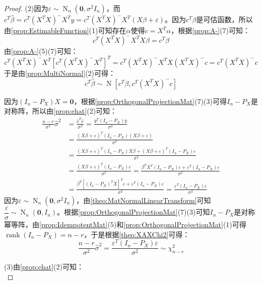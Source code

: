 \begin{proof}
	(2)因为$\varepsilon\sim\operatorname{N}_n(\mathbf{0},\sigma^2I_n)$，而$c^T\hat{\beta}=c^T(X^TX)^-X^Ty=c^T(X^TX)^-X^T(X\beta+\varepsilon)$。因为$c^T\beta$是可估函数，所以由\cref{prop:EstimableFunction}(1)可知存在$\alpha$使得$c=X^T\alpha$，根据\cref{prop:A-}(7)可知：
	\begin{equation*}
		c^T(X^TX)^-X^TX\beta=c^T\beta
	\end{equation*}
	由\cref{prop:A-}(5)(7)可知：
	\begin{equation*}
		c^T(X^TX)^-X^T[c^T(X^TX)^-X^T]^T=c^T(X^TX)^-X^TX(X^TX)^-c=c^T(X^TX)^-c
	\end{equation*}
	于是由\cref{prop:MultiNormal}(2)可得：
	\begin{equation*}
		c^T\hat{\beta}\sim\operatorname{N}[c^T\beta,c^T(X^TX)^-c]
	\end{equation*}\par
	因为$(I_n-P_X)X=\mathbf{0}$，根据\cref{prop:OrthogonalProjectionMat}(7)(3)可得$I_n-P_X$是对称阵，所以由\cref{prop:ehat}(2)可知：
	\begin{align*}
		\frac{n-r}{\sigma^2}\hat{\sigma}^2&=\frac{\hat{e}^T\hat{e}}{\sigma^2}=\frac{y^T(I_n-P_X)y}{\sigma^2} \\
		&=\frac{(X\beta+\varepsilon)^T(I_n-P_X)(X\beta+\varepsilon)}{\sigma^2} \\
		&=\frac{(X\beta+\varepsilon)^T(I_n-P_X)X\beta+(X\beta+\varepsilon)^T(I_n-P_X)\varepsilon}{\sigma^2} \\
		&=\frac{(X\beta+\varepsilon)^T(I_n-P_X)\varepsilon}{\sigma^2}=\frac{\beta^TX^T(I_n-P_X)\varepsilon+\varepsilon^T(I_n-P_X)\varepsilon}{\sigma^2} \\
		&=\frac{\beta^T[(I_n-P_X)^TX]^T\varepsilon+\varepsilon^T(I_n-P_X)\varepsilon}{\sigma^2}=\frac{\varepsilon^T(I_n-P_X)\varepsilon}{\sigma^2}
	\end{align*}
	因为$\varepsilon\sim\operatorname{N}_n(\mathbf{0},\sigma^2I_n)$，由\cref{theo:MatNormalLinearTransform}可知$\dfrac{\varepsilon}{\sigma}\sim\operatorname{N}_n(\mathbf{0},I_n)$。根据\cref{prop:OrthogonalProjectionMat}(7)(3)可知$I_n-P_X$是对称幂等阵，由\cref{prop:IdempotentMat}(5)和\cref{prop:OrthogonalProjectionMat}(1)可得$\operatorname{rank}(I_n-P_X)=n-r$，于是根据\cref{theo:XAXChi2}可得：
	\begin{equation*}
		\frac{n-r}{\sigma^2}\hat{\sigma}^2=\frac{\varepsilon^T(I_n-P_X)\varepsilon}{\sigma^2}\sim\chi_{n-r}^2
	\end{equation*}\par
	(3)由\cref{prop:ehat}(2)可知：
	\begin{equation*}

\end{equation*}
\end{proof}
